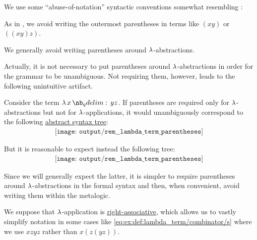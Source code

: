 \begin{remark}\label{rem:lambda_term_parentheses}
  We use some \enquote{abuse-of-notation} syntactic conventions somewhat resembling :
  \begin{thmenum}
     As in , we avoid writing the outermost parentheses in terms like \( (xy) \) or \( ((xy)z) \).

     We generally avoid writing parentheses around \( \mathrm{\lambda} \)-abstractions.

    Actually, it is not necessary to put parentheses around \( \mathrm{\lambda} \)-abstractions in order for the grammar to be unambiguous. Not requiring them, however, leads to the following unintuitive artifact.

    Consider the term \( \qabs x y z \). If parentheses are required only for \( \mathrm{\lambda} \)-abstractions but not for \( \mathrm{\lambda} \)-applications, it would unambiguously correspond to the following \hyperref[rem:lambda_term_ast]{abstract syntax tree}:
    \begin{equation*}
      \begin{aligned}
        \texttt{[image: output/rem\_\_lambda\_term\_parentheses]}
      \end{aligned}
    \end{equation*}

    But it is reasonable to expect instead the following tree:
    \begin{equation*}
      \begin{aligned}
        \texttt{[image: output/rem\_\_lambda\_term\_parentheses]}
      \end{aligned}
    \end{equation*}

    Since we will generally expect the latter, it is simpler to require parentheses around \( \mathrm{\lambda} \)-abstractions in the formal syntax and then, when convenient, avoid writing them within the metalogic.

     We suppose that \( \mathrm{\lambda} \)-application is \hyperref[rem:binary_operation_syntax_trees/associativity]{right-associative}, which allows us to vastly simplify notation in some cases like \eqref{eq:ex:def:lambda_term/combinator/s} where we use \( xzyz \) rather than \( x(z(yz)) \).
  \end{thmenum}
\end{remark}

